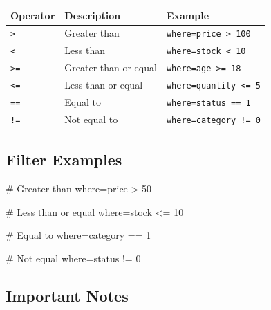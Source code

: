 \documentclass[
  letterpaper,
]{scrbook}
\newenvironment{Shaded}{\begin{snugshade}}{\end{snugshade}}
\newcommand{\CommentTok}[1]{\textcolor[rgb]{0.37,0.37,0.37}{#1}}
\newcommand{\NormalTok}[1]{\textcolor[rgb]{0.00,0.23,0.31}{#1}}
\newcommand{\OperatorTok}[1]{\textcolor[rgb]{0.37,0.37,0.37}{#1}}
\newcommand{\StringTok}[1]{\textcolor[rgb]{0.13,0.47,0.30}{#1}}
\begin{document}
\begin{longtable}[]{@{}lll@{}}
\toprule\noalign{}
Operator & Description & Example \\
\midrule\noalign{}
\endhead
\bottomrule\noalign{}
\endlastfoot
\texttt{\textgreater{}} & Greater than &
\texttt{where=\textquotesingle{}price\ \textgreater{}\ 100\textquotesingle{}} \\
\texttt{\textless{}} & Less than &
\texttt{where=\textquotesingle{}stock\ \textless{}\ 10\textquotesingle{}} \\
\texttt{\textgreater{}=} & Greater than or equal &
\texttt{where=\textquotesingle{}age\ \textgreater{}=\ 18\textquotesingle{}} \\
\texttt{\textless{}=} & Less than or equal &
\texttt{where=\textquotesingle{}quantity\ \textless{}=\ 5\textquotesingle{}} \\
\texttt{==} & Equal to &
\texttt{where=\textquotesingle{}status\ ==\ 1\textquotesingle{}} \\
\texttt{!=} & Not equal to &
\texttt{where=\textquotesingle{}category\ !=\ 0\textquotesingle{}} \\
\end{longtable}

\subsection{Filter Examples}\label{filter-examples}

\begin{Shaded}
\begin{Highlighting}[]
\CommentTok{\# Greater than}
\NormalTok{where}\OperatorTok{=}\StringTok{\textquotesingle{}price \textgreater{} 50\textquotesingle{}}

\CommentTok{\# Less than or equal}
\NormalTok{where}\OperatorTok{=}\StringTok{\textquotesingle{}stock \textless{}= 10\textquotesingle{}}

\CommentTok{\# Equal to}
\NormalTok{where}\OperatorTok{=}\StringTok{\textquotesingle{}category == 1\textquotesingle{}}

\CommentTok{\# Not equal}
\NormalTok{where}\OperatorTok{=}\StringTok{\textquotesingle{}status != 0\textquotesingle{}}
\end{Highlighting}
\end{Shaded}

\subsection{Important Notes}\label{important-notes-1}
\end{document}
